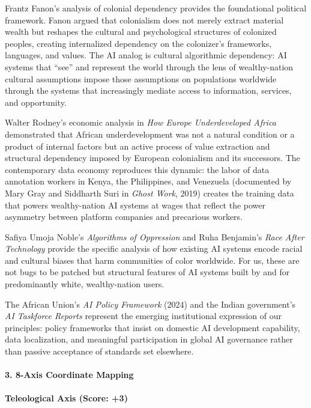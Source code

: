 Frantz Fanon's analysis of colonial dependency provides the foundational
political framework. Fanon argued that colonialism does not merely
extract material wealth but reshapes the cultural and psychological
structures of colonized peoples, creating internalized dependency on the
colonizer's frameworks, languages, and values. The AI analog is cultural
algorithmic dependency: AI systems that ``see'' and represent the world
through the lens of wealthy-nation cultural assumptions impose those
assumptions on populations worldwide through the systems that
increasingly mediate access to information, services, and opportunity.

Walter Rodney's economic analysis in \emph{How Europe Underdeveloped
Africa} demonstrated that African underdevelopment was not a natural
condition or a product of internal factors but an active process of
value extraction and structural dependency imposed by European
colonialism and its successors. The contemporary data economy reproduces
this dynamic: the labor of data annotation workers in Kenya, the
Philippines, and Venezuela (documented by Mary Gray and Siddharth Suri
in \emph{Ghost Work}, 2019) creates the training data that powers
wealthy-nation AI systems at wages that reflect the power asymmetry
between platform companies and precarious workers.

Safiya Umoja Noble's \emph{Algorithms of Oppression} and Ruha Benjamin's
\emph{Race After Technology} provide the specific analysis of how
existing AI systems encode racial and cultural biases that harm
communities of color worldwide. For us, these are not bugs to be patched
but structural features of AI systems built by and for predominantly
white, wealthy-nation users.

The African Union's \emph{AI Policy Framework} (2024) and the Indian
government's \emph{AI Taskforce Reports} represent the emerging
institutional expression of our principles: policy frameworks that
insist on domestic AI development capability, data localization, and
meaningful participation in global AI governance rather than passive
acceptance of standards set elsewhere.

\paragraph{3. 8-Axis Coordinate
Mapping}\label{axis-coordinate-mapping-44}

\paragraph{Teleological Axis (Score:
+3)}\label{teleological-axis-score-3-2}

